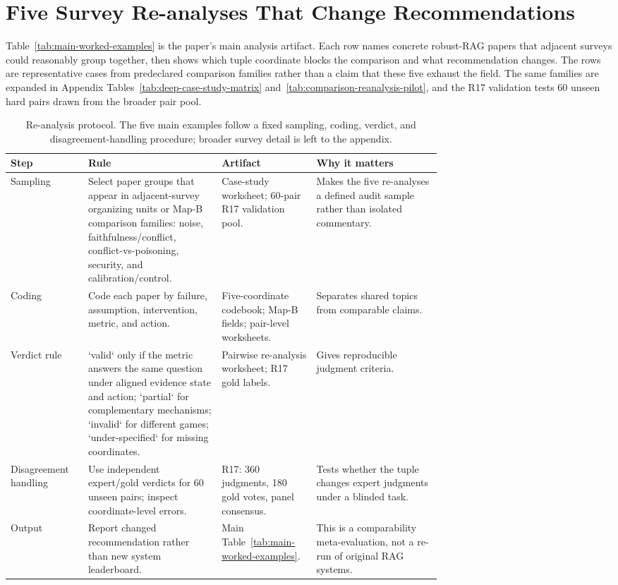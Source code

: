 \documentclass[11pt]{article}
\begin{document}
\section{Five Survey Re-analyses That Change Recommendations}

Table~\ref{tab:main-worked-examples} is the paper's main analysis artifact. Each row names concrete robust-RAG papers that adjacent surveys could reasonably group together, then shows which tuple coordinate blocks the comparison and what recommendation changes. The rows are representative cases from predeclared comparison families rather than a claim that these five exhaust the field. The same families are expanded in Appendix Tables~\ref{tab:deep-case-study-matrix} and~\ref{tab:comparison-reanalysis-pilot}, and the R17 validation tests 60 unseen hard pairs drawn from the broader pair pool.

\begin{table}[t]
\centering
\scriptsize
\renewcommand{\arraystretch}{0.9}
\begin{tabularx}{\linewidth}{>{\raggedright\arraybackslash}p{0.18\linewidth}>{\raggedright\arraybackslash}p{0.31\linewidth}>{\raggedright\arraybackslash}p{0.22\linewidth}X}
\toprule
\textbf{Step} & \textbf{Rule} & \textbf{Artifact} & \textbf{Why it matters} \\
\midrule
Sampling & Select paper groups that appear in adjacent-survey organizing units or Map-B comparison families: noise, faithfulness/conflict, conflict-vs-poisoning, security, and calibration/control. & Case-study worksheet; 60-pair R17 validation pool. & Makes the five re-analyses a defined audit sample rather than isolated commentary. \\
Coding & Code each paper by failure, assumption, intervention, metric, and action. & Five-coordinate codebook; Map-B fields; pair-level worksheets. & Separates shared topics from comparable claims. \\
Verdict rule & `valid` only if the metric answers the same question under aligned evidence state and action; `partial` for complementary mechanisms; `invalid` for different games; `under-specified` for missing coordinates. & Pairwise re-analysis worksheet; R17 gold labels. & Gives reproducible judgment criteria. \\
Disagreement handling & Use independent expert/gold verdicts for 60 unseen pairs; inspect coordinate-level errors. & R17: 360 judgments, 180 gold votes, panel consensus. & Tests whether the tuple changes expert judgments under a blinded task. \\
Output & Report changed recommendation rather than new system leaderboard. & Main Table~\ref{tab:main-worked-examples}. & This is a comparability meta-evaluation, not a re-run of original RAG systems. \\
\bottomrule
\end{tabularx}
\caption{Re-analysis protocol. The five main examples follow a fixed sampling, coding, verdict, and disagreement-handling procedure; broader survey detail is left to the appendix.}
\label{tab:reanalysis-protocol}
\end{table}
\end{document}
